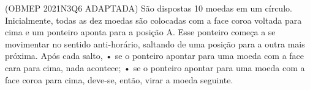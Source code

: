 \documentclass[preview]{standalone}
\begin{document}
\begin{center}
(OBMEP 2021N3Q6 ADAPTADA) São dispostas 10 moedas em um círculo.
Inicialmente, todas as dez moedas são colocadas com a face coroa voltada para cima e um
ponteiro aponta para a posição A. Esse ponteiro começa a se movimentar no sentido anti-horário,
saltando de uma posição para a outra mais próxima. 
Após cada salto,
• se o ponteiro apontar para uma moeda
com a face cara para cima, nada acontece;
• se o ponteiro apontar para uma moeda
com a face coroa para cima, deve-se, então,
virar a moeda seguinte.
\end{center}
\end{document}
